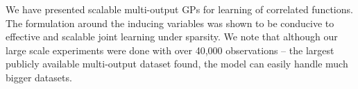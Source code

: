 We have presented scalable multi-output GPs for learning of correlated functions.
The formulation around the inducing variables was shown to be conducive to effective and scalable joint learning under sparsity. 
We note that although our large scale experiments were done with over 40,000 observations -- the largest publicly available multi-output dataset found, the model can easily handle much bigger datasets.


